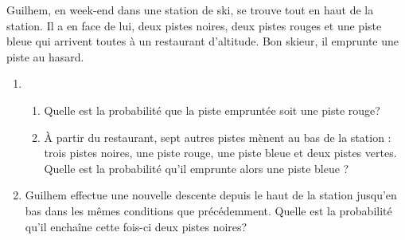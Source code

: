 
Guilhem, en week-end dans une station de ski, se trouve tout en haut de la station. Il a en face de lui, deux pistes noires, deux pistes rouges et une piste bleue qui arrivent toutes à un restaurant d’altitude. Bon skieur, il emprunte une piste au hasard.
\begin{enumerate}
\item 
\begin{enumerate}
\item Quelle est la probabilité que la piste empruntée soit une piste rouge?
\item À partir du restaurant, sept autres pistes mènent au bas de la station : trois pistes noires, une piste rouge, une piste bleue et deux pistes vertes. Quelle est la probabilité qu'il emprunte alors une piste bleue ?
\end{enumerate}
\item Guilhem effectue une nouvelle descente depuis le haut de la station jusqu'en bas dans les mêmes conditions que précédemment.
Quelle est la probabilité qu'il enchaîne cette fois-ci deux pistes noires?

\end{enumerate}